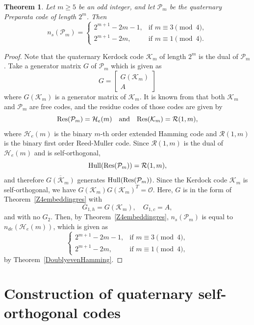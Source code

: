 \documentclass{article}
\newtheorem{theorem}{Theorem}[section]
\theoremstyle{definition}
\theoremstyle{remark}
\begin{document}
\begin{theorem}\label{Preparata_emb}
Let $m\ge 5$ be an odd integer, and let $\mathcal P_m$ be the
quaternary Preparata code of length $2^m$. Then
\[
n_s(\mathcal{P}_m)=
\begin{cases}
2^{m+1}-2m-1, & \text{if } m\equiv3\pmod4,\\
2^{m+1}-2m, & \text{if } m\equiv1\pmod4.
\end{cases}
\]
\end{theorem}
\begin{proof}
Note that the quaternary Kerdock code $\mathcal{K}_m$ of length $2^m$ is the dual of $\mathcal{P}_m$. Take a generator matrix $G$ of $\mathcal{P}_m$ which is given as
\[
G=\begin{bmatrix}
    G(\mathcal{K}_m)\\A
\end{bmatrix}
\]
where $G(\mathcal{K}_m)$ is a generator matrix of $\mathcal{K}_m$. It is known from \cite{HKCSS-1994} that both $\mathcal{K}_m$ and $\mathcal{P}_m$ are free codes, and the residue codes of those codes are given by
\[
{\rm Res}(\mathcal{P}_m)=\mathcal{H}_e(m)\quad\mbox{and}\quad{\rm Res}(\mathcal{K}_m)=\mathcal{R}(1, m),
\]
where $\mathcal{H}_e(m)$ is the binary $m$-th order extended Hamming code and $\mathcal{R}(1, m)$ is the binary first order Reed-Muller code. Since $\mathcal{R}(1, m)$ is the dual of $\mathcal{H}_e(m)$ and is self-orthogonal,
\[
{\rm{Hull}}({\rm Res}(\mathcal{P}_m))=\mathcal{R}(1, m),
\]
and therefore $\overline{G(\mathcal{K}_m)}$ generates ${\rm{Hull}}({\rm Res}(\mathcal{P}_m))$. Since the Kerdock code $\mathcal{K}_m$ is self-orthogonal, we have $G(\mathcal{K}_m)G(\mathcal{K}_m)^T=\mathcal{O}$. Here, $G$ is in the form of Theorem~\ref{Z4embeddingres}
with
\[
    G_{1,h}=G(\mathcal K_m),\quad G_{1,c}=A,
\]
and with no $G_2$. Then, by Theorem~\ref{Z4embeddingres}, $n_s(\mathcal{P}_m)$ is equal to $n_{de}(\mathcal{H}_e(m))$, which is given as
\[
\begin{cases}
2^{m+1}-2m-1, & \text{if } m\equiv3\pmod4,\\
2^{m+1}-2m, & \text{if } m\equiv1\pmod4,
\end{cases}
\]
by Theorem~\ref{DoublyevenHamming}.
\end{proof}

\section{Construction of quaternary self-orthogonal codes}
\end{document}
